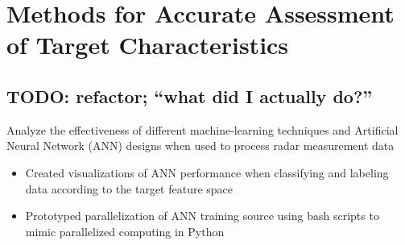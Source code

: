 \documentclass[10pt,a4paper]{article}
\begin{document}
  \section{Methods for Accurate Assessment of Target Characteristics}
    \subsection{TODO: refactor; ``what did I actually do?''}
      Analyze the effectiveness of different machine-learning techniques and
      Artificial Neural Network (ANN) designs when used to process radar
      measurement data
      \begin{itemize}
        \item Created visualizations of ANN performance when classifying and
            labeling data according to the target feature space
        \item Prototyped parallelization of ANN training source using bash
            scripts to mimic parallelized computing in Python
      \end{itemize}
\end{document}
